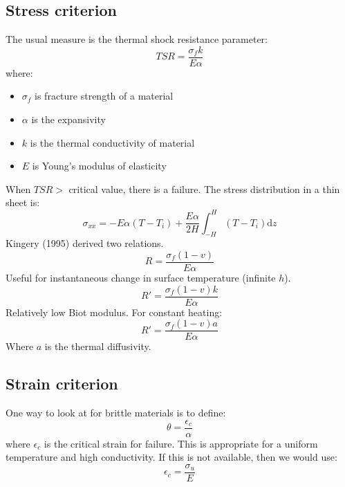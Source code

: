 \subsection{Stress criterion}
The usual measure is the thermal shock resistance parameter:
\begin{equation}
    TSR = \frac{\sigma_fk}{E\alpha}
\end{equation}
where:
\begin{itemize}
    \item $\sigma_f$ is fracture strength of a material
    \item $\alpha$ is the expansivity
    \item $k$ is the thermal conductivity of material
    \item $E$ is Young's modulus of elasticity
\end{itemize}
When $TSR>$ critical value, there is a failure. The stress distribution in a thin sheet is:
\begin{equation}
    \sigma_{xx} = -E\alpha\left(T-T_i\right) + \frac{E\alpha}{2H}\int_{-H}^H\left(T-T_i\right)\textrm{d}z
\end{equation}
Kingery (1995) derived two relations.
\begin{equation}
    R = \frac{\sigma_f \left(1- v\right)}{E\alpha}
\end{equation}
Useful for instantaneous change in surface temperature (infinite $h$).
\begin{equation}
    R' = \frac{\sigma_f \left(1-v\right)k}{E\alpha}
\end{equation}
Relatively low Biot modulus. For constant heating:
\begin{equation}
    R' = \frac{\sigma_f\left(1-v\right)a}{E\alpha}
\end{equation}
Where $a$ is the thermal diffusivity.
\subsection{Strain criterion}
One way to look at for brittle materials is to define:
\begin{equation}
    \theta = \frac{\epsilon_c}{\alpha}
\end{equation}
where $\epsilon_c$ is the critical strain for failure. This is appropriate for a uniform temperature and high conductivity. If this is not available, then we would use:
\begin{equation}
    \epsilon_c = \frac{\sigma_u}{E}
\end{equation}
